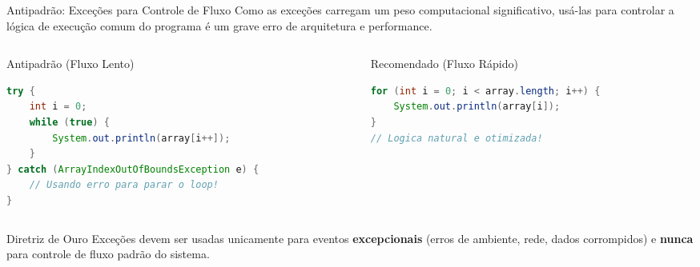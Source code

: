 \documentclass[9pt]{beamer}
\begin{document}
\begin{frame}[fragile]{Antipadrão: Exceções para Controle de Fluxo}
    Como as exceções carregam um peso computacional significativo, usá-las para controlar a lógica de execução comum do programa é um grave erro de arquitetura e performance.
    
    \vspace{0.1cm}
    
    \begin{columns}[t]
        \begin{column}{0.48\textwidth}
            \begin{block}{Antipadrão (Fluxo Lento)}
                \begin{lstlisting}[language=Java,numbers=none]
try {
    int i = 0;
    while (true) {
        System.out.println(array[i++]);
    }
} catch (ArrayIndexOutOfBoundsException e) {
    // Usando erro para parar o loop!
}
\end{lstlisting}
            \end{block}
        \end{column}
        
        \begin{column}{0.48\textwidth}
            \begin{block}{Recomendado (Fluxo Rápido)}
                \begin{lstlisting}[language=Java,numbers=none]
for (int i = 0; i < array.length; i++) {
    System.out.println(array[i]);
}
// Logica natural e otimizada!
\end{lstlisting}
            \end{block}
        \end{column}
    \end{columns}
    
    \vspace{0.15cm}
    \begin{alertblock}{Diretriz de Ouro}
        \small
        Exceções devem ser usadas unicamente para eventos \textbf{excepcionais} (erros de ambiente, rede, dados corrompidos) e \textbf{nunca} para controle de fluxo padrão do sistema.
    \end{alertblock}
\end{frame}
\end{document}
